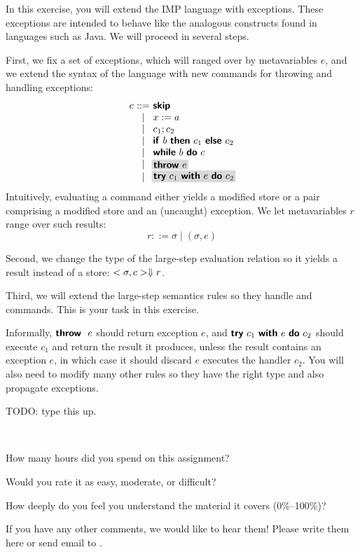 \documentclass[11pt]{article}
\begin{document}
\begin{exercise}

\newcommand{\THROW}[1]{\ensuremath{\impfnt{throw}~#1}}
\newcommand{\TRYCATCH}[3]{\ensuremath{\impfnt{try}~#1~\impfnt{with}~#2~\DO~#3}}

In this exercise, you will extend the IMP language with
exceptions. These exceptions are intended to behave like the analogous
constructs found in languages such as Java. We will proceed in several
steps.

First, we fix a set of exceptions, which will ranged over by
metavariables $e$, and we extend the syntax of the language with new
commands for throwing and handling exceptions:
%
\[
\begin{array}{r@{~}c@{~}l}
 c & ::= & \SKIP \\
& \mid & x := a\\
& \mid & c_1 ; c_2\\
& \mid & \cond{b}{c_1}{c_2} \\
& \mid & \while{b}{c} \\
& \mid & \shade{\THROW{e}} \\
& \mid & \shade{\TRYCATCH{c_1}{e}{c_2}}
\end{array}
\]
%
Intuitively, evaluating a command either yields a modified store or a
pair comprising a modified store and an (uncaught) exception. We let
metavariables $r$ range over such results:
%
\[
r ::= \sigma \mid (\sigma,e)
\]
%

Second, we change the type of the large-step evaluation relation so it
yields a result instead of a store: $<\sigma,c> \Downarrow r$.

Third, we will extend the large-step semantics rules so they handle
 and  commands. This is your task in this
exercise. 

Informally, $\THROW~e$ should return exception $e$, and
$\TRYCATCH{c_1}{e}{c_2}$ should execute $c_1$ and return the result it
produces, unless the result contains an exception $e$, in which case
it should discard $e$ executes the handler $c_2$. You will also need
to modify many other rules so they have the right type and also
propagate exceptions.

TODO: type this up.

\end{exercise}

\begin{debriefing} \hfill\\[-4ex]
\begin{enumerate*}
\item How many hours did you spend on this assignment? 
\item Would you rate it as easy, moderate, or difficult? 
\item How deeply do you feel you understand the material it covers (0\%–100\%)? 
\item If you have any other comments, we would like to hear them!
  Please write them here or send email to
  .
\end{enumerate*}
\end{debriefing}
\end{document}
